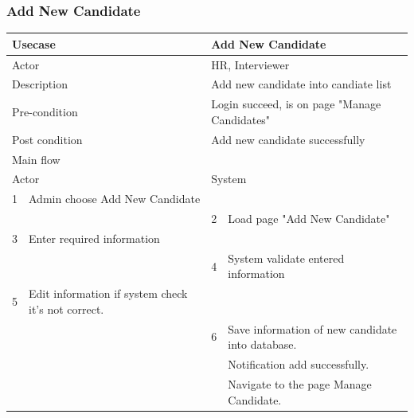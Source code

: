 \documentclass[a4paper]{article}
\begin{document}
\subsubsection{Add New Candidate}
\begin{tabular}{|l|p{5cm}||l|p{5cm}|}
	\hline 
	\multicolumn{2}{|p{5cm}|}{Usecase} & \multicolumn{2}{|p{5cm}|}{Add New Candidate}\\ 
	\hline 
	\multicolumn{2}{|p{5cm}|}{Actor} & \multicolumn{2}{|p{5cm}|}{HR, Interviewer} \\ 
	\hline 
	\multicolumn{2}{|p{5cm}|}{Description} & \multicolumn{2}{|p{5cm}|}{Add new candidate into candiate list}\\
	\hline
	\multicolumn{2}{|p{5cm}|}{Pre-condition} & \multicolumn{2}{|p{5cm}|}{Login succeed, is on page "Manage Candidates"}\\
	\hline
	\multicolumn{2}{|p{5cm}|}{Post condition} & \multicolumn{2}{|p{5cm}|}{Add new candidate successfully} \\
	\hline
	\multicolumn{4}{|l|}{Main flow} \\
	\hline
	\multicolumn{2}{|p{5cm}|}{Actor} & \multicolumn{2}{|p{5cm}|}{System} \\
	\hline
	1 & Admin choose Add New Candidate & & \\
	\hline
	& & 2 & Load page "Add New Candidate" \\
	\hline 
	3 & Enter required information & & \\	
	\hline
	& & 4 &System validate entered information \\	
	\hline 
	5 & Edit information if system check it's not correct. & & \\	
	\hline
	& & 6 &Save information of new candidate into database.\\
	& &  &Notification add successfully.\\
	& & &Navigate to the page Manage Candidate. \\	
	\hline 	
\end{tabular}
\end{document}
